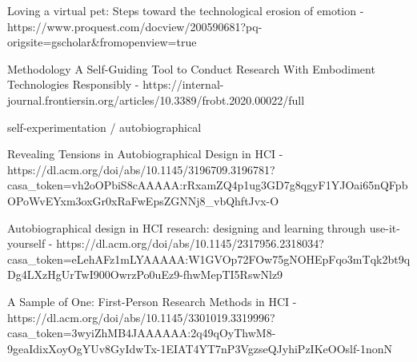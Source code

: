 Loving a virtual pet: Steps toward the technological erosion of emotion - https://www.proquest.com/docview/200590681?pq-origsite=gscholar&fromopenview=true




Methodology
A Self-Guiding Tool to Conduct Research With Embodiment Technologies Responsibly - https://internal-journal.frontiersin.org/articles/10.3389/frobt.2020.00022/full


self-experimentation / autobiographical


Revealing Tensions in Autobiographical Design in HCI - https://dl.acm.org/doi/abs/10.1145/3196709.3196781?casa_token=vh2oOPbiS8cAAAAA:rRxamZQ4p1ug3GD7g8qgyF1YJOai65nQFpbOPoWvEYxm3oxGr0xRaFwEpsZGNNj8_vbQhftJvx-O


Autobiographical design in HCI research: designing and learning through use-it-yourself - https://dl.acm.org/doi/abs/10.1145/2317956.2318034?casa_token=eLehAFz1mLYAAAAA:W1GVOp72FOw75gNOHEpFqo3mTqk2bt9qDg4LXzHgUrTwI900OwrzPo0uEz9-fhwMepTI5RswNlz9

A Sample of One: First-Person Research Methods in HCI - https://dl.acm.org/doi/abs/10.1145/3301019.3319996?casa_token=3wyiZhMB4JAAAAAA:2q49qOyThwM8-9geaIdixXoyOgYUv8GyIdwTx-1EIAT4YT7nP3VgzseQJyhiPzIKeOOslf-1nonN